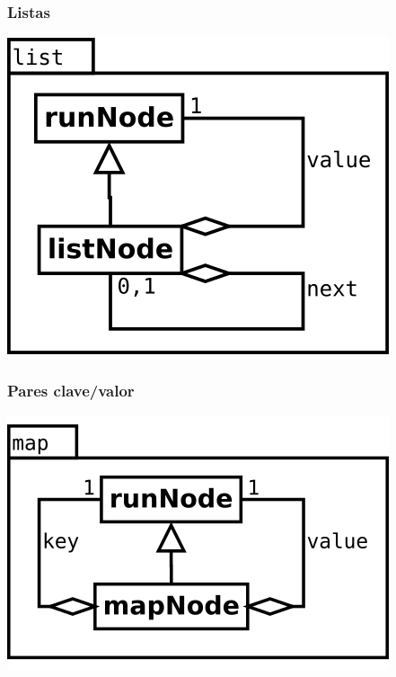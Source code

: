 \subsubsection {Listas}
\begin{center}
\includegraphics[scale=0.4]{list.png} \\
\end{center}

\subsubsection {Pares clave/valor}
\begin{center}
\includegraphics[scale=0.4]{map.png} \\
\end{center}

